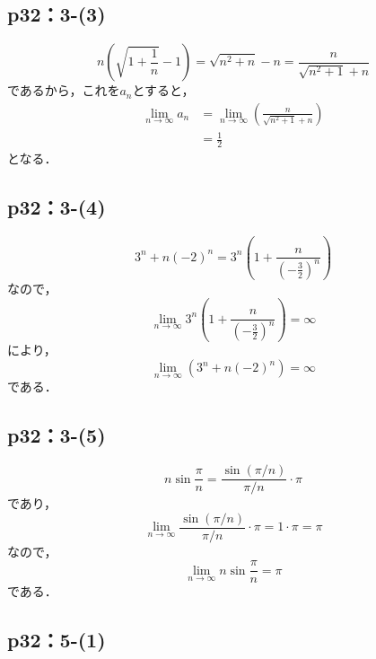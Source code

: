 \documentclass[uplatex,dvipdfmx,a4paper,10pt,fleqn]{jsarticle}
\begin{document}
\subsection*{p32：3-(3)}

\begin{tleftbar}
    \[
        n \left ( \sqrt{1+\frac{1}{n}}-1 \right) = \sqrt{n^2+n}-n = \frac{n}{\sqrt{n^2+1}+n}
    \]
    であるから，これを$a_n$とすると，
    \begin{align*}
        \lim_{n \to \infty} a_n & =\lim_{n \to \infty}  \left ( \frac{n}{\sqrt{n^2+1}+n} \right) \\
        & = \frac{1}{2}
    \end{align*}
    となる．
\end{tleftbar}

\subsection*{p32：3-(4)}

\begin{tleftbar}
\[
    3^n +n(-2)^n = 3^n \left (1+ \frac{n}{ \left (-\frac{3}{2} \right)^n } \right)
\]
なので，
\[
    \lim_{n \to \infty}  3^n \left (1+ \frac{n}{ \left (-\frac{3}{2} \right)^n } \right) =\infty
\]
により，
\[
    \lim_{n \to \infty} (3^n +n(-2)^n)=\infty 
\]
である．
\end{tleftbar}



\subsection*{p32：3-(5)}

\begin{tleftbar}
    \[
        n \sin \frac{\pi}{n} = \frac{\sin (\pi/n)}{\pi/n} \cdot \pi　
    \]
    であり，
    \[
        \lim_{n \to \infty} \frac{\sin (\pi/n)}{\pi/n} \cdot \pi　= 1 \cdot \pi =\pi
    \]
    なので，
    \[
        \lim_{n \to \infty} n \sin \frac{\pi}{n} = \pi
    \]
    である．
\end{tleftbar}




\subsection*{p32：5-(1)}
\end{document}
